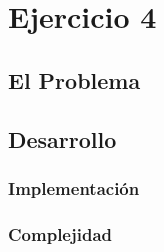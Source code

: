 \section{Ejercicio 4}
\subsection{El Problema}
\subsection{Desarrollo}
\subsubsection{Implementación}
\subsubsection{Complejidad}
